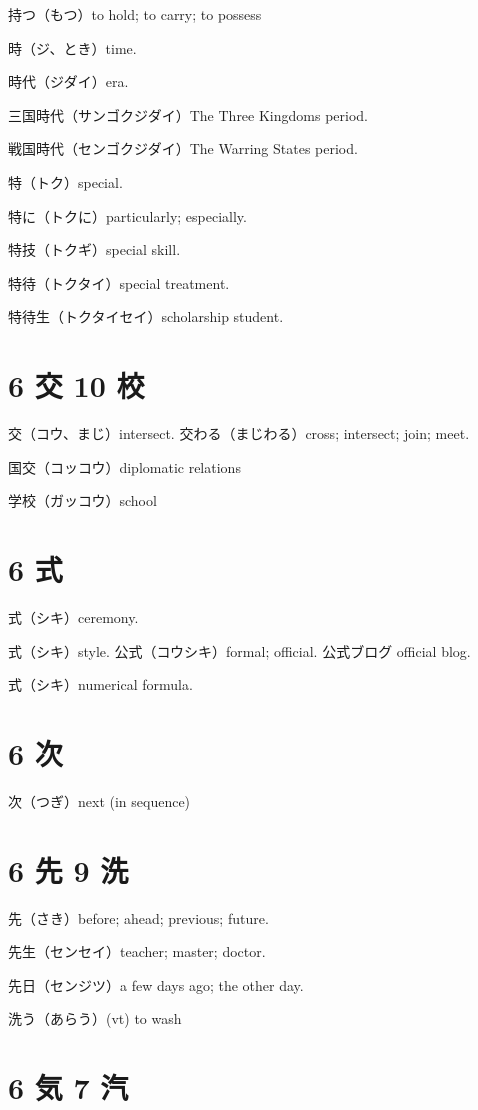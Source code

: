 持つ（もつ）to hold; to carry; to possess

時（ジ、とき）time.

時代（ジダイ）era.

三国時代（サンゴクジダイ）The Three Kingdoms period.

戦国時代（センゴクジダイ）The Warring States period.

特（トク）special.

特に（トクに）particularly; especially.

特技（トクギ）special skill.

特待（トクタイ）special treatment.

特待生（トクタイセイ）scholarship student.

\section{6 交 10 校}

交（コウ、まじ）intersect.
交わる（まじわる）cross; intersect; join; meet.

国交（コッコウ）diplomatic relations

学校（ガッコウ）school

\section{6 式}

式（シキ）ceremony.

式（シキ）style.
公式（コウシキ）formal; official.
公式ブログ official blog.

式（シキ）numerical formula.

\section{6 次}

次（つぎ）next (in sequence)

\section{6 先 9 洗}

先（さき）before; ahead; previous; future.

先生（センセイ）teacher; master; doctor.

先日（センジツ）a few days ago; the other day.

洗う（あらう）(vt) to wash

\section{6 気 7 汽}

